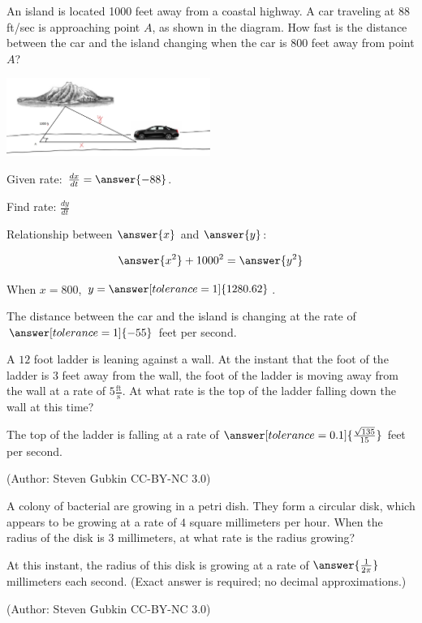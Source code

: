 \documentclass{ximera}
\begin{document}
 
 
 \begin{problem}\label{prob:240hom5prob2}
An island is located 1000 feet away from a coastal highway.  A car traveling at 88 ft/sec is approaching point $A$, as shown in the diagram.  How fast is the distance between the car and the island changing when the car is 800 feet away from point $A$?
\begin{image}
   
\includegraphics[height=1in]{Inkedtest2image4.jpg}~
 
\end{image}

Given rate: $\frac{dx}{dt}=\answer{-88}$.

Find rate:  $\frac{dy}{dt}$

Relationship between $\answer{x}$ and $\answer{y}$:

$$\answer{x^2}+1000^2=\answer{y^2}$$

When $x=800$, $y=\answer[tolerance=1]{1280.62}$.

The distance between the car and the island is changing at the rate of $\answer[tolerance=1]{-55}$ feet per second.
 \end{problem}
 
 \begin{problem}\label{prob:240hom5prob7}
 A $12$ foot ladder is leaning against a wall.  At the instant that the foot of the ladder is $3$ feet away from the wall, the foot of the ladder is moving away from the wall at a rate of $5 \frac{\textrm{ft}}{\textrm{s}}$.  At what rate is the top of the ladder falling down the wall at this time?

The top of the ladder is falling at a rate of $\answer[tolerance=0.1]{\frac{\sqrt{135}}{15}}$ feet per second.

(Author: Steven Gubkin CC-BY-NC 3.0)
 \end{problem}
 
 \begin{problem}\label{prob:240hom5prob8}
 A colony of bacterial are growing in a petri dish.  They form a
circular disk, which appears to be growing at a rate of $4$ square
millimeters per hour.  When the radius of the disk is $3$ millimeters,
at what rate is the radius growing?

At this instant, the radius of this disk is growing at a rate
  of $\answer{\frac{1}{2\pi}}$ millimeters each second.  (Exact answer is required; no decimal approximations.)
  
 (Author: Steven Gubkin CC-BY-NC 3.0)
 \end{problem}
 

 
\end{document}
